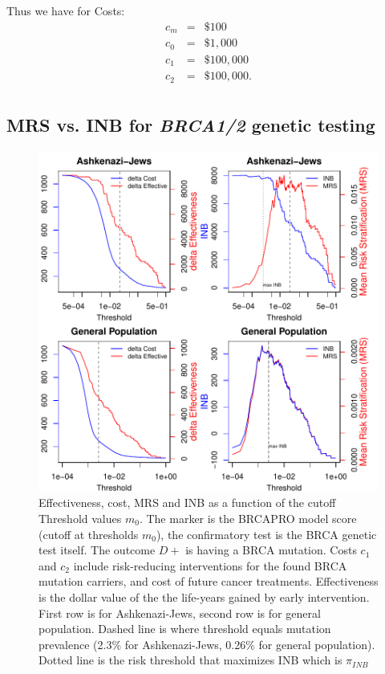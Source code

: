 \documentclass[11pt]{article}
\begin{document}
Thus we have for Costs:
\begin{eqnarray*}
  c_m &=& \$100 \\
  c_0 &=& \$1,000 \\
  c_1 &=& \$100,000 \\
  c_2 &=& \$100,000. \\
\end{eqnarray*}


\subsection{MRS vs. INB for \textit{BRCA1/2} genetic testing}


\begin{figure}
\begin{center}
\includegraphics{Screening_biomarker_07142018-MRS_INB}
\end{center}
\label{fig:two}
\caption{Effectiveness, cost, MRS and INB as a function of the cutoff Threshold values $m_0$.  The marker is the BRCAPRO model score (cutoff at thresholds $m_0$), the confirmatory test is the BRCA genetic test itself.  The outcome $D+$ is having a BRCA mutation.  Costs $c_1$ and $c_2$ include risk-reducing interventions for the found BRCA mutation carriers, and cost of future cancer treatments. Effectiveness is the dollar value of the the life-years gained by early intervention.  First row is for Ashkenazi-Jews, second row is for general population.  Dashed line is where threshold equals mutation prevalence (2.3\% for Ashkenazi-Jews, 0.26\% for general population).  Dotted line is the risk threshold that maximizes INB which is $\pi_{INB}$}
\end{figure}
\end{document}
